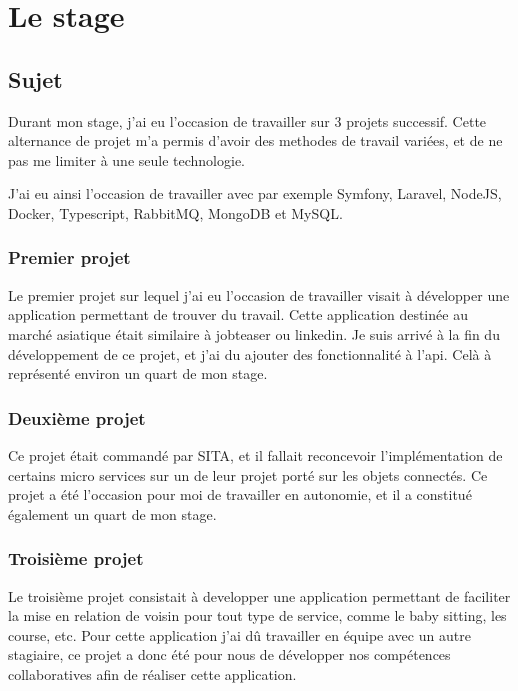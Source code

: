 \documentclass[../rapport.tex]{subfiles}
\begin{document}
    \chapter{Le stage}
    \section{Sujet}
        Durant mon stage, j'ai eu l'occasion de travailler sur 3 projets successif.
        Cette alternance de projet m'a permis d'avoir des methodes de travail variées,
        et de ne pas me limiter à une seule technologie.

        J'ai eu ainsi l'occasion de travailler avec par exemple Symfony,
        Laravel, NodeJS, Docker, Typescript, RabbitMQ, MongoDB et MySQL.

        \subsection{Premier projet}
        Le premier projet sur lequel j'ai eu l'occasion de travailler visait à
        développer une application permettant de trouver du travail. Cette
        application destinée au marché asiatique était similaire à jobteaser ou
        linkedin. Je suis arrivé à la fin du développement de ce projet, et j'ai du 
        ajouter des fonctionnalité à l'\gls{api}. Celà à représenté environ un quart de mon
        stage.

        \subsection{Deuxième projet}
        Ce projet était commandé par SITA, et il fallait reconcevoir l'implémentation
        de certains micro services sur un de leur projet porté sur les objets
        connectés.
        Ce projet a été l'occasion pour moi de travailler en autonomie, et il a
        constitué également un quart de mon stage.

        \subsection{Troisième projet}
        Le troisième projet consistait à developper une application permettant
        de faciliter la mise en relation de voisin pour tout type de service, comme
        le baby sitting, les course, etc. Pour cette application j'ai dû travailler en
        équipe avec un autre stagiaire, ce projet a donc été pour nous de développer 
        nos compétences collaboratives afin de réaliser cette application.
\end{document}
